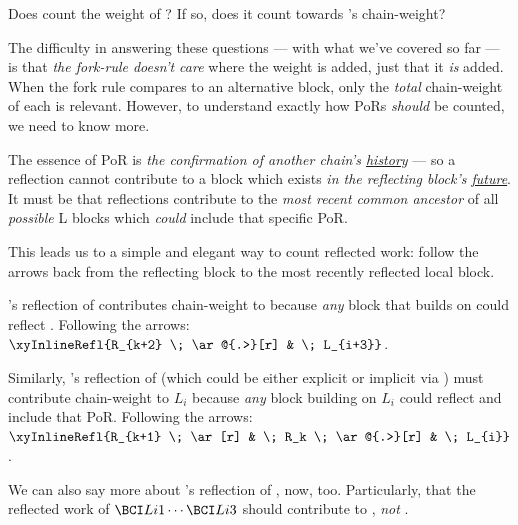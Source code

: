 Does  count the weight of ?
If so, does it count towards 's chain-weight?

The difficulty in answering these questions --- with what we've covered so far --- is that \emph{the fork-rule doesn't care} where the weight is added, just that it \emph{is} added.
When the fork rule compares  to an alternative block, only the \emph{total} chain-weight of each is relevant.
However, to understand exactly how PoRs \emph{should} be counted, we need to know more.

The essence of PoR is \emph{the confirmation of another chain's \ul{history}} --- so a reflection cannot contribute to a block which exists \emph{in the reflecting block's \ul{future}}.
It must be that reflections contribute to the \emph{most recent common ancestor} of all \emph{possible} L blocks which \emph{could} include that specific PoR.

This leads us to a simple and elegant way to count reflected work: follow the arrows back from the reflecting block to the most recently reflected local block.

's reflection of  contributes chain-weight to  because \emph{any} block that builds on  could reflect .
Following the arrows: $\xyInlineRefl{R_{k+2} \; \ar@{.>}[r] & \; L_{i+3}}$.


Similarly, 's reflection of  (which could be either explicit or implicit via ) must contribute chain-weight to $L_i$ because \emph{any} block building on $L_i$ could reflect  and include that PoR.
Following the arrows: $\xyInlineRefl{R_{k+1} \; \ar[r] & \; R_k \; \ar@{.>}[r] & \; L_{i}}$.


We can also say more about 's reflection of , now, too.
Particularly, that the reflected work of $\BL{1}\cdots \BL{3}$ should contribute to \BR{}, \emph{not} .

